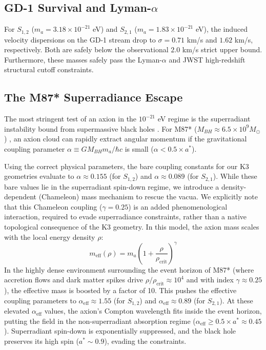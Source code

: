 \documentclass[11pt,a4paper]{article}
\begin{document}
\subsection{GD-1 Survival and Lyman-$\alpha$}
For $S_{1,2}$ ($m_a = 3.18 \times 10^{-21}$ eV) and $S_{2,1}$ ($m_a = 1.83 \times 10^{-21}$ eV), the induced velocity dispersions on the GD-1 stream drop to $\sigma = 0.71$ km/s and $1.62$ km/s, respectively. Both are safely below the observational $2.0$ km/s strict upper bound. Furthermore, these masses safely pass the Lyman-$\alpha$ and JWST high-redshift structural cutoff constraints.

\subsection{The M87* Superradiance Escape}
The most stringent test of an axion in the $10^{-21}$ eV regime is the superradiant instability bound from supermassive black holes \cite{detweiler1980klein, arvanitaki2010string}. For M87* ($M_{BH} \approx 6.5 \times 10^9 M_\odot$) \cite{eht2019first}, an axion cloud can rapidly extract angular momentum if the gravitational coupling parameter $\alpha \equiv G M_{BH} m_a / \hbar c$ is small ($\alpha < 0.5 \times a^*$). 

Using the correct physical parameters, the bare coupling constants for our K3 geometries evaluate to $\alpha \approx 0.155$ (for $S_{1,2}$) and $\alpha \approx 0.089$ (for $S_{2,1}$). While these bare values lie in the superradiant spin-down regime, we introduce a density-dependent (Chameleon) mass mechanism \cite{khoury2004chameleon} to rescue the vacua. We explicitly note that this Chameleon coupling ($\gamma = 0.25$) is an added phenomenological interaction, required to evade superradiance constraints, rather than a native topological consequence of the K3 geometry. In this model, the axion mass scales with the local energy density $\rho$:
\begin{equation}
m_{\text{eff}}(\rho) = m_a \left(1 + \frac{\rho}{\rho_{\text{crit}}}\right)^\gamma
\end{equation}
In the highly dense environment surrounding the event horizon of M87* (where accretion flows and dark matter spikes drive $\rho/\rho_{\text{crit}} \approx 10^4$ and with index $\gamma \approx 0.25$), the effective mass is boosted by a factor of 10. This pushes the effective coupling parameters to $\alpha_{\text{eff}} \approx 1.55$ (for $S_{1,2}$) and $\alpha_{\text{eff}} \approx 0.89$ (for $S_{2,1}$). At these elevated $\alpha_{\text{eff}}$ values, the axion's Compton wavelength fits inside the event horizon, putting the field in the non-superradiant absorption regime ($\alpha_{\text{eff}} \ge 0.5 \times a^* \approx 0.45$). Superradiant spin-down is exponentially suppressed, and the black hole preserves its high spin ($a^* \sim 0.9$), evading the constraints.
\end{document}
